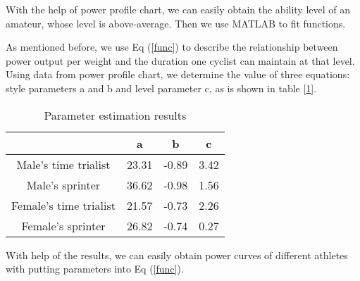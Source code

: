With the help of power profile chart, we can easily obtain the ability level of an amateur, whose level is above-average. Then we use MATLAB to fit functions. 
\par As mentioned before, we use Eq (\ref{func}) to describe the relationship between power output per weight and the duration one cyclist can maintain at that level. Using data from power profile chart, we determine the value of three equations: style parameters a and b and level parameter c, as is shown in table [\ref{para:abc}].


\begin{table}[htbp]
	\setlength{\belowcaptionskip}{0.2cm}
	\setlength\tabcolsep{13pt}%
	\centering
	\caption{Parameter estimation results}
	\begin{tabular}{cccc}
		\toprule[2pt]
		& {\bf a}     & {\bf b}     & {\bf c} \\
		\midrule
		Male's time trialist & 23.31 & -0.89 & 3.42 \\
		Male's sprinter & 36.62 & -0.98 & 1.56 \\
		Female's time trialist & 21.57 & -0.73 & 2.26 \\
		Female's sprinter & 26.82 & -0.74 & 0.27 \\
		\bottomrule[2pt]
	\end{tabular}%
	\label{para:abc}%
\end{table}%
\par With help of the results, we can easily obtain power curves of different athletes with putting parameters into Eq (\ref{func}).
